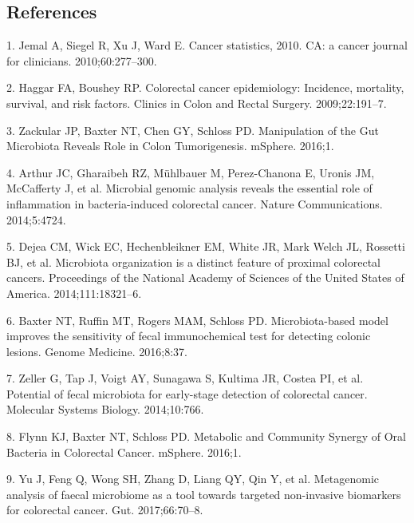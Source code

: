\documentclass[12pt,]{article}
\begin{document}
\newpage

\subsection*{References}\label{references}

\hypertarget{refs}{}
\hypertarget{ref-jemal_cancer_2010}{}
1. Jemal A, Siegel R, Xu J, Ward E. Cancer statistics, 2010. CA: a
cancer journal for clinicians. 2010;60:277--300.

\hypertarget{ref-haggar_colorectal_2009}{}
2. Haggar FA, Boushey RP. Colorectal cancer epidemiology: Incidence,
mortality, survival, and risk factors. Clinics in Colon and Rectal
Surgery. 2009;22:191--7.

\hypertarget{ref-zackular_manipulation_2016}{}
3. Zackular JP, Baxter NT, Chen GY, Schloss PD. Manipulation of the Gut
Microbiota Reveals Role in Colon Tumorigenesis. mSphere. 2016;1.

\hypertarget{ref-arthur_microbial_2014}{}
4. Arthur JC, Gharaibeh RZ, Mühlbauer M, Perez-Chanona E, Uronis JM,
McCafferty J, et al. Microbial genomic analysis reveals the essential
role of inflammation in bacteria-induced colorectal cancer. Nature
Communications. 2014;5:4724.

\hypertarget{ref-dejea_microbiota_2014}{}
5. Dejea CM, Wick EC, Hechenbleikner EM, White JR, Mark Welch JL,
Rossetti BJ, et al. Microbiota organization is a distinct feature of
proximal colorectal cancers. Proceedings of the National Academy of
Sciences of the United States of America. 2014;111:18321--6.

\hypertarget{ref-baxter_microbiota-based_2016}{}
6. Baxter NT, Ruffin MT, Rogers MAM, Schloss PD. Microbiota-based model
improves the sensitivity of fecal immunochemical test for detecting
colonic lesions. Genome Medicine. 2016;8:37.

\hypertarget{ref-zeller_potential_2014}{}
7. Zeller G, Tap J, Voigt AY, Sunagawa S, Kultima JR, Costea PI, et al.
Potential of fecal microbiota for early-stage detection of colorectal
cancer. Molecular Systems Biology. 2014;10:766.

\hypertarget{ref-flynn_metabolic_2016}{}
8. Flynn KJ, Baxter NT, Schloss PD. Metabolic and Community Synergy of
Oral Bacteria in Colorectal Cancer. mSphere. 2016;1.

\hypertarget{ref-yu_metagenomic_2017}{}
9. Yu J, Feng Q, Wong SH, Zhang D, Liang QY, Qin Y, et al. Metagenomic
analysis of faecal microbiome as a tool towards targeted non-invasive
biomarkers for colorectal cancer. Gut. 2017;66:70--8.
\end{document}

